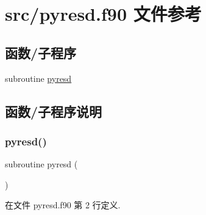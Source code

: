 \hypertarget{pyresd_8f90}{}\section{src/pyresd.f90 文件参考}
\label{pyresd_8f90}
\subsection*{函数/子程序}
\begin{DoxyCompactItemize}
\item 
subroutine \mbox{\hyperlink{pyresd_8f90_a72d4075dc223b982c0db0b46e3492e70}{pyresd}}
\end{DoxyCompactItemize}


\subsection{函数/子程序说明}
\mbox{\label{pyresd_8f90_a72d4075dc223b982c0db0b46e3492e70}} 
\subsubsection{\texorpdfstring{pyresd()}{pyresd()}}
{\footnotesize\ttfamily subroutine pyresd (\begin{DoxyParamCaption}{ }\end{DoxyParamCaption})}



在文件 pyresd.\+f90 第 2 行定义.


